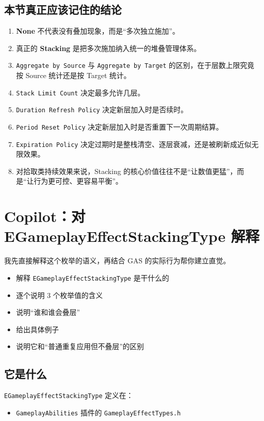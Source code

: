 \subsection{本节真正应该记住的结论}

\begin{enumerate}
	\item \textbf{None} 不代表没有叠加现象，而是“多次独立施加”。
	\item 真正的 \textbf{Stacking} 是把多次施加纳入统一的堆叠管理体系。
	\item \texttt{Aggregate by Source} 与 \texttt{Aggregate by Target} 的区别，在于层数上限究竟按 Source 统计还是按 Target 统计。
	\item \texttt{Stack Limit Count} 决定最多允许几层。
	\item \texttt{Duration Refresh Policy} 决定新层加入时是否续时。
	\item \texttt{Period Reset Policy} 决定新层加入时是否重置下一次周期结算。
	\item \texttt{Expiration Policy} 决定过期时是整栈清空、逐层衰减，还是被刷新成近似无限效果。
	\item 对拾取类持续效果来说，Stacking 的核心价值往往不是“让数值更猛”，而是“让行为更可控、更容易平衡”。
\end{enumerate}

\section{Copilot：对EGameplayEffectStackingType 解释}

我先直接解释这个枚举的语义，再结合 GAS 的实际行为帮你建立直觉。

\begin{itemize}
	\item 解释 \texttt{EGameplayEffectStackingType} 是干什么的
	\item 逐个说明 3 个枚举值的含义
	\item 说明“谁和谁会叠层”
	\item 给出具体例子
	\item 说明它和“普通重复应用但不叠层”的区别
\end{itemize}

\subsection{它是什么}

\texttt{EGameplayEffectStackingType} 定义在：

\begin{itemize}
	\item \texttt{GameplayAbilities} 插件的 \texttt{GameplayEffectTypes.h}
\end{itemize}

